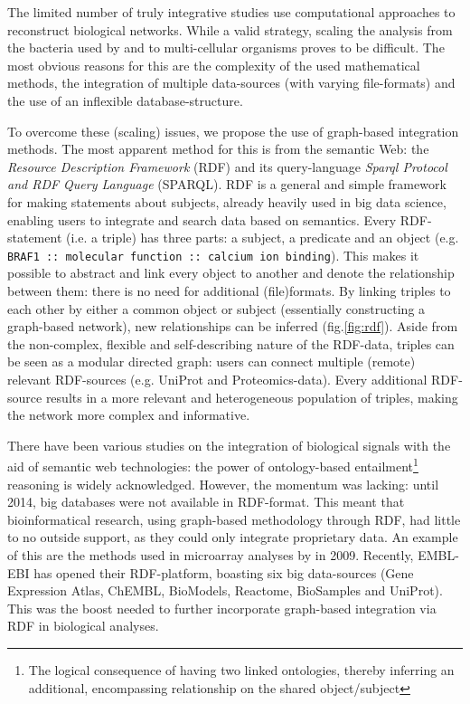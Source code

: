 \documentclass[twoside,fontsize=12pt]{article}
\begin{document}
The limited number of truly integrative studies use computational approaches to reconstruct biological networks. While a valid strategy, scaling the analysis from the bacteria used by \citet{Karr2012} and \citet{Lerman2012} to multi-cellular organisms proves to be difficult. The most obvious reasons for this are the complexity of the used mathematical methods, the integration of multiple data-sources (with varying file-formats) and the use of an inflexible database-structure.
\medskip

\noindent
To overcome these (scaling) issues, we propose the use of graph-based integration methods. The most apparent method for this is from the semantic Web: the \textit{Resource Description Framework} (RDF) and its query-language \textit{Sparql Protocol and RDF Query Language} (SPARQL). RDF is a general and simple framework for making statements about subjects, already heavily used in big data science, enabling users to integrate and search data based on semantics. Every RDF-statement (i.e. a triple) has three parts: a subject, a predicate and an object (e.g. \lstinline|BRAF1 :: molecular function :: calcium ion binding|). This makes it possible to abstract and link every object to another and denote the relationship between them: there is no need for additional (file)formats. By linking triples to each other by either a common object or subject (essentially constructing a graph-based network), new relationships can be inferred (fig.\ref{fig:rdf}). Aside from the non-complex, flexible and self-describing nature of the RDF-data, triples can be seen as a modular directed graph: users can connect multiple (remote) relevant RDF-sources (e.g. UniProt and Proteomics-data). Every additional RDF-source results in a more relevant and heterogeneous population of triples, making the network more complex and informative. 


\newpage
There have been various studies on the integration of biological signals with the aid of semantic web technologies: the power of ontology-based entailment\footnote{The logical consequence of having two linked ontologies, thereby inferring an additional, encompassing relationship on the shared object/subject} reasoning is widely acknowledged\cite{Sahoo2008}. However, the momentum was lacking: until 2014, big databases were not available in RDF-format. This meant that bioinformatical research, using graph-based methodology through RDF, had little to no outside support, as they could only integrate proprietary data. An example of this are the methods used in microarray analyses by \citet{Szpakowski2009} in 2009. Recently, EMBL-EBI has opened their RDF-platform, boasting six big data-sources (Gene Expression Atlas, ChEMBL, BioModels, Reactome, BioSamples and UniProt)\cite{Jupp2014}. This was the boost needed to further incorporate graph-based integration via RDF in biological analyses.
\medskip
\end{document}
